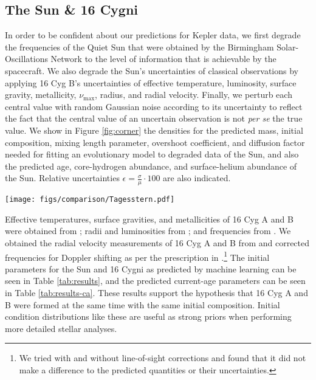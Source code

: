 \documentclass[manuscript]{aastex}
\begin{document}
\subsection{The Sun \& 16 Cygni}
In order to be confident about our predictions for Kepler data, we first degrade the frequencies of the Quiet Sun that were obtained by the Birmingham Solar-Oscillations Network \citep[BiSON,][]{2014MNRAS.439.2025D} to the level of information that is achievable by the spacecraft. We also degrade the Sun's uncertainties of classical observations by applying 16 Cyg B's uncertainties of effective temperature, luminosity, surface gravity, metallicity, $\nu_{\max}$, radius, and radial velocity. Finally, we perturb each central value with random Gaussian noise according to its uncertainty to reflect the fact that the central value of an uncertain observation is not \emph{per se} the true value. We show in Figure \ref{fig:corner} the densities for the predicted mass, initial composition, mixing length parameter, overshoot coefficient, and diffusion factor needed for fitting an evolutionary model to degraded data of the Sun, and also the predicted age, core-hydrogen abundance, and surface-helium abundance of the Sun. Relative uncertainties $\epsilon = \frac{\sigma}{\mu}\cdot 100$ are also indicated. 

\begin{figure*}
    \centering
    \texttt{[image: figs/comparison/Tagesstern.pdf]}
    \caption{Predictions from machine learning of initial (top six) and current-age (bottom three) stellar parameters for degraded solar data. Labels are placed at the mean and 3$\sigma$ levels. Dotted lines indicate the median and quartiles. Relative uncertainties $\epsilon$ are shown beside each plot. }
    \label{fig:corner}
\end{figure*}

Effective temperatures, surface gravities, and metallicities of 16 Cyg A and B were obtained from \citet{2009A&A...508L..17R}; radii and luminosities from \citet{2013MNRAS.433.1262W}; and frequencies from \citet{2015MNRAS.446.2959D}. We obtained the radial velocity measurements of 16 Cyg A and B from \citet{2002ApJS..141..503N} and corrected frequencies for Doppler shifting as per the prescription in \citet{2014MNRAS.445L..94D}.\footnote{We tried with and without line-of-sight corrections and found that it did not make a difference to the predicted quantities or their uncertainties.} The initial parameters for the Sun and 16 Cygni as predicted by machine learning can be seen in Table \ref{tab:results}, and the predicted current-age parameters can be seen in Table \ref{tab:results-ca}. These results support the hypothesis that 16 Cyg A and B were formed at the same time with the same initial composition. Initial condition distributions like these are useful as strong priors when performing more detailed stellar analyses. 
\end{document}
